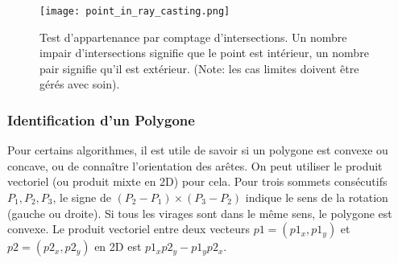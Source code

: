 \documentclass{article}
\begin{document}
\begin{figure}[H]
\centering
\texttt{[image: point\_in\_ray\_casting.png]}
\caption{Test d'appartenance par comptage d'intersections. Un nombre impair d'intersections signifie que le point est intérieur, un nombre pair signifie qu'il est extérieur. (Note: les cas limites doivent être gérés avec soin).}
\label{fig:point_in_ray_casting}
\end{figure}

\subsubsection{Identification d'un Polygone}
Pour certains algorithmes, il est utile de savoir si un polygone est convexe ou concave, ou de connaître l'orientation des arêtes. On peut utiliser le produit vectoriel (ou produit mixte en 2D) pour cela. Pour trois sommets consécutifs $P_1, P_2, P_3$, le signe de $(P_2 - P_1) \times (P_3 - P_2)$ indique le sens de la rotation (gauche ou droite). Si tous les virages sont dans le même sens, le polygone est convexe. Le produit vectoriel entre deux vecteurs $p1 = (p1_x, p1_y)$ et $p2 = (p2_x, p2_y)$ en 2D est $p1_x p2_y - p1_y p2_x$.
\end{document}
